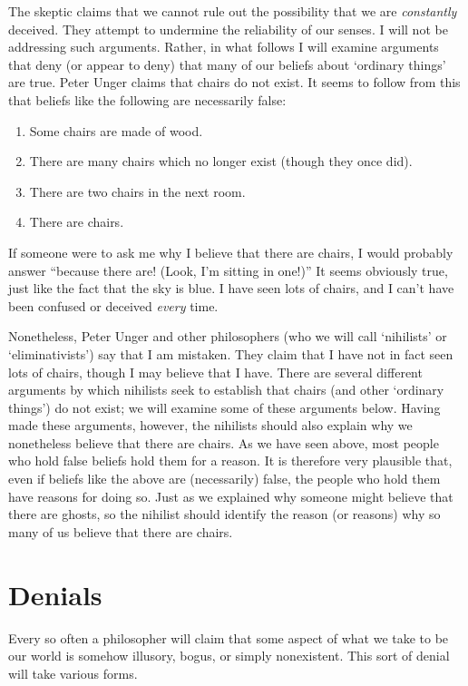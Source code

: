 \documentclass[11pt]{standalone}
\begin{document}
\begin{spacing}{1.5}
The skeptic claims that we cannot rule out the possibility that we are
{\em constantly} deceived.  They attempt to undermine the reliability
of our senses.  I will not be addressing such arguments.  Rather, in
what follows I will examine arguments that deny (or appear to deny)
that many of our beliefs about `ordinary things' are true.  Peter
Unger claims that chairs do not exist.  It seems to follow from this
that beliefs like the following are necessarily false:

\begin{enumerate}
  \item Some chairs are made of wood.
  \item There are many chairs which no longer exist (though they once
    did).
  \item There are two chairs in the next room.
  \item There are chairs.
\end{enumerate}

If someone were to ask me why I believe that there are chairs, I would
probably answer ``because there are!  (Look, I'm sitting in one!)''
It seems obviously true, just like the fact that the sky is blue.  I
have seen lots of chairs, and I can't have been confused or deceived
{\em every} time.

Nonetheless, Peter Unger and other philosophers (who we will call
`nihilists' or `eliminativists') say that I am mistaken.  They claim
that I have not in fact seen lots of chairs, though I may believe that
I have.  There are several different arguments by which nihilists seek
to establish that chairs (and other `ordinary things') do not exist;
we will examine some of these arguments below.  Having made these
arguments, however, the nihilists should also explain why we
nonetheless believe that there are chairs.  As we have seen above,
most people who hold false beliefs hold them for a reason.  It is
therefore very plausible that, even if beliefs like the above are
(necessarily) false, the people who hold them have reasons for doing
so.  Just as we explained why someone might believe that there are
ghosts, so the nihilist should identify the reason (or reasons) why so
many of us believe that there are chairs.

\section{Denials}
Every so often a philosopher will claim that some aspect of
what we take to be our world is somehow illusory, bogus, or simply
nonexistent.  This sort of denial will take various forms.  


\end{spacing}
\end{document}
